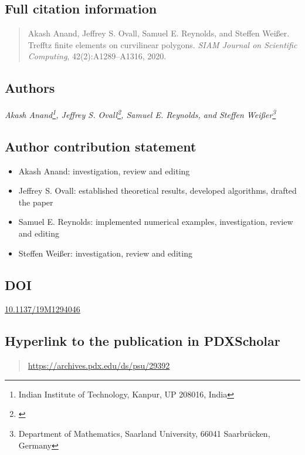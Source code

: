 \subsection*{Full citation information}
  \begin{quote}
    Akash Anand, Jeffrey S. Ovall, Samuel E. Reynolds, and Steffen Wei\ss{}er.
    Trefftz finite elements on curvilinear polygons.
    \textit{SIAM Journal on Scientific Computing}, 42(2):A1289--A1316, 2020.
  \end{quote}

\subsection*{Authors}
  \textit{Akash Anand\footnote{Indian Institute of Technology, Kanpur, UP 208016, India},
  Jeffrey S. Ovall\footnote{\label{PSU-affil-2}\PSU},
  Samuel E. Reynolds, and
  Steffen Wei\ss{}er\footnote{Department of Mathematics,
  Saarland University, 66041 Saarbr\"ucken, Germany}}

\subsection*{Author contribution statement}
    \begin{itemize}
      \item Akash Anand: investigation, review and editing
      \item Jeffrey S. Ovall:  established theoretical results, developed algorithms, drafted the paper
      \item Samuel E. Reynolds: implemented numerical examples, investigation, review and editing
      \item Steffen Wei\ss{}er: investigation, review and editing
    \end{itemize}

\subsection*{DOI}
  \href{https://doi.org/10.1137/19M1294046}{10.1137/19M1294046}

\subsection*{Hyperlink to the publication in PDXScholar}
  \begin{quote}
    \url{https://archives.pdx.edu/ds/psu/29392}
  \end{quote}